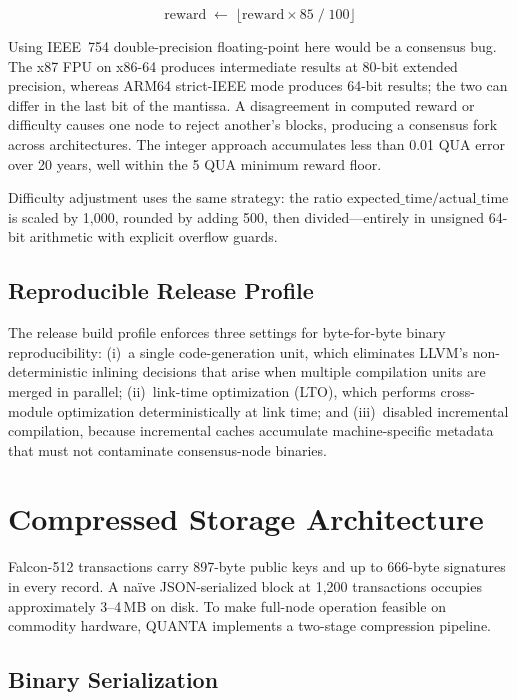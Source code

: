 \documentclass[11pt,a4paper]{article}
\begin{document}
\[
  \text{reward} \;\leftarrow\; \lfloor \text{reward} \times 85 \;/\; 100 \rfloor
\]

Using IEEE~754 double-precision floating-point here would be a consensus bug.
The x87 FPU on x86-64 produces intermediate results at 80-bit extended
precision, whereas ARM64 strict-IEEE mode produces 64-bit results; the two can
differ in the last bit of the mantissa. A disagreement in computed reward or
difficulty causes one node to reject another's blocks, producing a consensus
fork across architectures. The integer approach accumulates less than 0.01
QUA error over 20 years, well within the 5 QUA minimum reward floor.

Difficulty adjustment uses the same strategy: the ratio
$\text{expected\_time} / \text{actual\_time}$ is scaled by 1,000, rounded by
adding 500, then divided---entirely in unsigned 64-bit arithmetic with explicit
overflow guards.

\subsection{Reproducible Release Profile}

The release build profile enforces three settings for byte-for-byte binary
reproducibility: (i)~a single code-generation unit, which eliminates LLVM's
non-deterministic inlining decisions that arise when multiple compilation units
are merged in parallel; (ii)~link-time optimization (LTO), which performs
cross-module optimization deterministically at link time; and (iii)~disabled
incremental compilation, because incremental caches accumulate machine-specific
metadata that must not contaminate consensus-node binaries.

\section{Compressed Storage Architecture}
\label{sec:storage}

Falcon-512 transactions carry 897-byte public keys and up to 666-byte
signatures in every record. A na\"{i}ve JSON-serialized block at 1,200
transactions occupies approximately 3--4\,MB on disk. To make full-node
operation feasible on commodity hardware, QUANTA implements a two-stage
compression pipeline.

\subsection{Binary Serialization}
\end{document}
